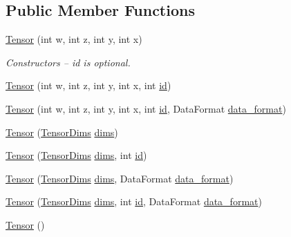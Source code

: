 \subsection*{Public Member Functions}
\begin{DoxyCompactItemize}
\item 
\hyperlink{classllk_1_1Tensor_a81f468a4cb7d319155de32409bef5432}{Tensor} (int w, int z, int y, int x)
\begin{DoxyCompactList}\small\item\em Constructors -- id is optional. \end{DoxyCompactList}\item 
\hyperlink{classllk_1_1Tensor_af67761de11995474009060754829083e}{Tensor} (int w, int z, int y, int x, int \hyperlink{classllk_1_1Tensor_ae2065c91de3ad15ae38c0df9d8762f1d}{id})
\item 
\hyperlink{classllk_1_1Tensor_a4966d01a028605d769148b46de392d91}{Tensor} (int w, int z, int y, int x, int \hyperlink{classllk_1_1Tensor_ae2065c91de3ad15ae38c0df9d8762f1d}{id}, Data\+Format \hyperlink{classllk_1_1Tensor_a7a956f878f61e36905df16a6c3b043aa}{data\+\_\+format})
\item 
\hyperlink{classllk_1_1Tensor_ad86bb1c93adc9b270b066d8760838f64}{Tensor} (\hyperlink{structllk_1_1TensorDims}{Tensor\+Dims} \hyperlink{classllk_1_1Tensor_a6bad1b600bb823472f1aa770d3bbc173}{dims})
\item 
\hyperlink{classllk_1_1Tensor_a328c405eea14680ceb9dfaf56bbbd1e3}{Tensor} (\hyperlink{structllk_1_1TensorDims}{Tensor\+Dims} \hyperlink{classllk_1_1Tensor_a6bad1b600bb823472f1aa770d3bbc173}{dims}, int \hyperlink{classllk_1_1Tensor_ae2065c91de3ad15ae38c0df9d8762f1d}{id})
\item 
\hyperlink{classllk_1_1Tensor_ade260687d190ff78582a6c97e9d39445}{Tensor} (\hyperlink{structllk_1_1TensorDims}{Tensor\+Dims} \hyperlink{classllk_1_1Tensor_a6bad1b600bb823472f1aa770d3bbc173}{dims}, Data\+Format \hyperlink{classllk_1_1Tensor_a7a956f878f61e36905df16a6c3b043aa}{data\+\_\+format})
\item 
\hyperlink{classllk_1_1Tensor_ac7d05556590a616bbd1e913cefd5300a}{Tensor} (\hyperlink{structllk_1_1TensorDims}{Tensor\+Dims} \hyperlink{classllk_1_1Tensor_a6bad1b600bb823472f1aa770d3bbc173}{dims}, int \hyperlink{classllk_1_1Tensor_ae2065c91de3ad15ae38c0df9d8762f1d}{id}, Data\+Format \hyperlink{classllk_1_1Tensor_a7a956f878f61e36905df16a6c3b043aa}{data\+\_\+format})
\item 
\hyperlink{classllk_1_1Tensor_a34c1f8340785e0e96d44cb69a8f85d89}{Tensor} ()

\end{DoxyCompactItemize}
